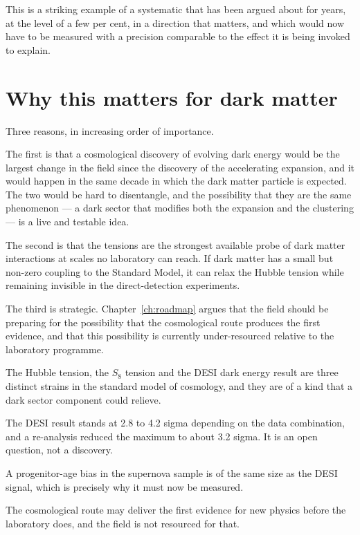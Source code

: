 This is a striking example of a systematic that has been argued about for
years, at the level of a few per cent, in a direction that matters, and which
would now have to be measured with a precision comparable to the effect it is
being invoked to explain.

\section{Why this matters for dark matter}Three reasons, in increasing order of
importance.

The first is that a cosmological discovery of evolving dark energy would be
the largest change in the field since the discovery of the accelerating
expansion, and it would happen in the same decade in which the dark matter
particle is expected. The two would be hard to disentangle, and the
possibility that they are the same phenomenon --- a dark sector that
modifies both the expansion and the clustering --- is a live and testable
idea.

The second is that the tensions are the strongest available probe of dark
matter interactions at scales no laboratory can reach. If dark matter has a
small but non-zero coupling to the Standard Model, it can relax the Hubble
tension while remaining invisible in the direct-detection experiments.

The third is strategic. Chapter~\ref{ch:roadmap} argues that the field should
be preparing for the possibility that the cosmological route produces the
first evidence, and that this possibility is currently under-resourced
relative to the laboratory programme.

\begin{keytakeaways}
\item The Hubble tension, the $S_8$ tension and the DESI dark energy
result are three distinct strains in the standard model of cosmology, and
they are of a kind that a dark sector component could relieve.
\item The DESI result stands at 2.8 to 4.2 sigma depending on the data
combination, and a re-analysis reduced the maximum to about 3.2 sigma. It is
an open question, not a discovery.
\item A progenitor-age bias in the supernova sample is of the same size as
the DESI signal, which is precisely why it must now be measured.
\item The cosmological route may deliver the first evidence for new physics
before the laboratory does, and the field is not resourced for that.
\end{keytakeaways}
